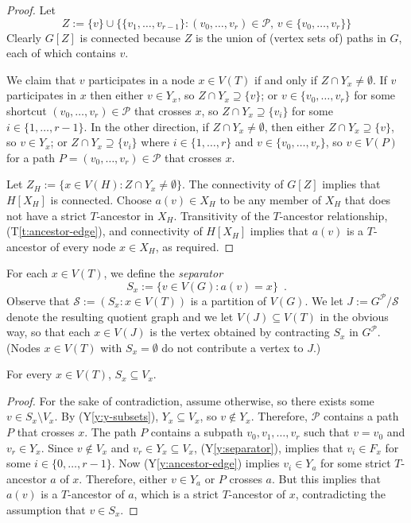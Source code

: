 \documentclass{patmorin}
\newcommand{\tref}[1]{(T\ref{t:#1})}
\newcommand{\yref}[1]{(Y\ref{y:#1})}
\begin{document}
\begin{proof}
  Let 
  \[
     Z := \{v\} \cup \{\{v_1,\ldots,v_{r-1}\}:\mbox{$(v_0,\ldots,v_r)\in\mathcal{P}$, $v\in \{v_0,\ldots,v_r\}$}\}
  \]
  Clearly $G[Z]$ is connected because $Z$ is the union of (vertex sets of) paths in $G$, each of which contains $v$. 
  
  We claim that $v$ participates in a node $x\in V(T)$ if and only if $Z\cap Y_x\neq\emptyset$.  If $v$ participates in $x$ then either $v\in Y_x$, so $Z\cap Y_x\supseteq\{v\}$; or $v\in \{v_0,\ldots,v_r\}$ for some shortcut $(v_0,\ldots,v_r)\in\mathcal{P}$ that crosses $x$, so $Z\cap Y_x\supseteq \{v_i\}$ for some $i\in\{1,\ldots,r-1\}$.  In the other direction, if $Z\cap Y_x\neq\emptyset$, then either $Z\cap Y_x\supseteq \{v\}$, so $v\in Y_x$; or $Z\cap Y_x\supseteq \{v_i\}$ where $i\in\{1,\ldots,r\}$ and $v\in\{v_0,\ldots,v_r\}$, so $v\in V(P)$ for a path $P=(v_0,\ldots,v_r)\in\mathcal{P}$ that crosses $x$. 

  Let $Z_H:=\{x\in V(H): Z\cap Y_x\neq\emptyset\}$.  The connectivity of $G[Z]$ implies that $H[X_H]$ is connected.  
  Choose $a(v)\in X_H$ to be any member of $X_H$ that does not have a strict $T$-ancestor in $X_H$.  Transitivity of the $T$-ancestor relationship, \tref{ancestor-edge}, and connectivity of $H[X_H]$ implies that $a(v)$ is a $T$-ancestor of every node $x\in X_H$, as required.
\end{proof}

For each $x\in V(T)$, we define the \emph{separator}
\[  
     S_x := \{v\in V(G): a(v)= x\} \enspace .
\]
Observe that $\mathcal{S}:=(S_x : x\in V(T))$ is a partition of $V(G)$.  We let $J:=G^\mathcal{P}/\mathcal{S}$ denote the resulting quotient graph and we let $V(J)\subseteq V(T)$ in the obvious way, so that each $x\in V(J)$ is the vertex obtained by contracting $S_x$ in $G^{\mathcal{P}}$. (Nodes $x\in V(T)$ with $S_x=\emptyset$ do not contribute a vertex to $J$.)

\begin{clm}
  For every $x\in V(T)$, $S_x\subseteq V_x$.
\end{clm}

\begin{proof}
  For the sake of contradiction, assume otherwise, so there exists some $v\in S_x\setminus V_x$. By \yref{y-subsets}, $Y_x\subseteq V_x$, so $v\not\in Y_x$.  Therefore, $\mathcal{P}$ contains a path $P$ that crosses $x$.  The path $P$ contains a subpath $v_0,v_1,\ldots,v_{r}$ such that $v=v_0$ and $v_r\in Y_x$. Since $v\not\in V_x$ and $v_r\in Y_x\subseteq V_x$, \yref{separator}, implies that $v_i\in F_x$ for some $i\in\{0,\ldots,r-1\}$. Now \yref{ancestor-edge} implies $v_i\in Y_a$ for some strict $T$-ancestor $a$ of $x$.  Therefore, either $v\in Y_a$ or $P$ crosses $a$. But this implies that $a(v)$ is a $T$-ancestor of $a$, which is a strict $T$-ancestor of $x$, contradicting the assumption that $v\in S_x$.
\end{proof}
\end{document}
